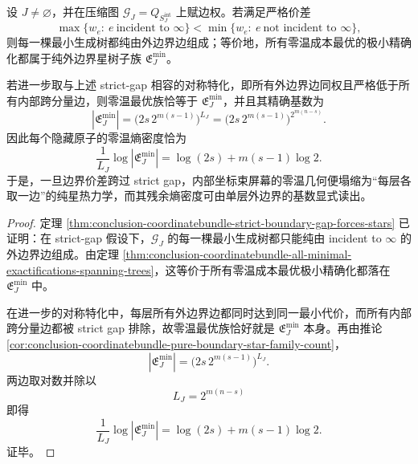 \begin{theorem}[严格边界价差下的纯星零温塌缩与熵密度]\label{thm:conclusion-coordinatebundle-pure-star-zero-temperature-entropy}
设 \(J\neq \varnothing\)，并在压缩图 \(\mathcal G_J=Q_{S_J^{\mathrm{int}}}\) 上赋边权。若满足严格价差
\[
\max\{w_e:\ e\ \text{incident to }\infty\}
<
\min\{w_e:\ e\ \text{not incident to }\infty\},
\]
则每一棵最小生成树都纯由外边界边组成；等价地，所有零温成本最优的极小精确化都属于纯外边界星树子族 \(\mathfrak E_J^{\min}\)。

若进一步取与上述 strict-gap 相容的对称特化，即所有外边界边同权且严格低于所有内部跨分量边，则零温最优族恰等于 \(\mathfrak E_J^{\min}\)，并且其精确基数为
\[
|\mathfrak E_J^{\min}|
=
\bigl(2s\,2^{m(s-1)}\bigr)^{L_J}
=
\bigl(2s\,2^{m(s-1)}\bigr)^{2^{m(n-s)}}.
\]
因此每个隐藏原子的零温熵密度恰为
\[
\frac{1}{L_J}\log |\mathfrak E_J^{\min}|
=
\log(2s)+m(s-1)\log 2.
\]
于是，一旦边界价差跨过 strict gap，内部坐标束屏幕的零温几何便塌缩为“每层各取一边”的纯星热力学，而其残余熵密度可由单层外边界的基数显式读出。
\end{theorem}
\begin{proof}
定理 \ref{thm:conclusion-coordinatebundle-strict-boundary-gap-forces-stars} 已证明：在 strict-gap 假设下，\(\mathcal G_J\) 的每一棵最小生成树都只能纯由 incident to \(\infty\) 的外边界边组成。由定理 \ref{thm:conclusion-coordinatebundle-all-minimal-exactifications-spanning-trees}，这等价于所有零温成本最优极小精确化都落在 \(\mathfrak E_J^{\min}\) 中。

在进一步的对称特化中，每层所有外边界边都同时达到同一最小代价，而所有内部跨分量边都被 strict gap 排除，故零温最优族恰好就是 \(\mathfrak E_J^{\min}\) 本身。再由推论 \ref{cor:conclusion-coordinatebundle-pure-boundary-star-family-count}，
\[
|\mathfrak E_J^{\min}|
=
\bigl(2s\,2^{m(s-1)}\bigr)^{L_J}.
\]
两边取对数并除以
\[
L_J=2^{m(n-s)}
\]
即得
\[
\frac{1}{L_J}\log |\mathfrak E_J^{\min}|
=
\log(2s)+m(s-1)\log 2.
\]
证毕。
\end{proof}

